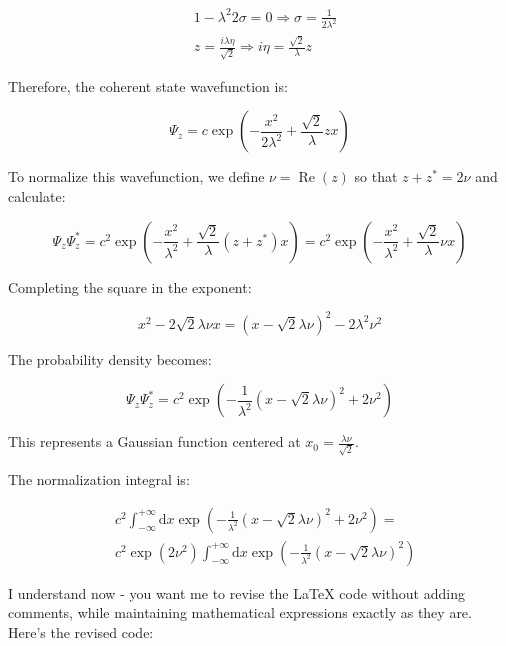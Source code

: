 \documentclass[italian]{HKNdocument}
\begin{document}
\begin{align*}
& 1-\lambda^{2} 2 \sigma=0 \Longrightarrow \sigma=\frac{1}{2 \lambda^{2}} \\
& z=\frac{i \lambda \eta}{\sqrt{2}} \Longrightarrow i \eta=\frac{\sqrt{2}}{\lambda} z \tag{7.52}
\end{align*}

Therefore, the coherent state wavefunction is:

\begin{equation*}
\Psi_{z}=c \exp \left(-\frac{x^{2}}{2 \lambda^{2}}+\frac{\sqrt{2}}{\lambda} z x\right) \tag{7.53}
\end{equation*}

To normalize this wavefunction, we define $\nu=\operatorname{Re}(z)$ so that $z+z^{*}=2 \nu$ and calculate:

\begin{equation*}
\Psi_{z} \Psi_{z}^{*}=c^{2} \exp \left(-\frac{x^{2}}{\lambda^{2}}+\frac{\sqrt{2}}{\lambda}\left(z+z^{*}\right) x\right)=c^{2} \exp \left(-\frac{x^{2}}{\lambda^{2}}+\frac{\sqrt{2}}{\lambda} \nu x\right) \tag{7.54}
\end{equation*}

Completing the square in the exponent:

\begin{equation*}
x^{2}-2 \sqrt{2} \lambda \nu x=(x-\sqrt{2} \lambda \nu)^{2}-2 \lambda^{2} \nu^{2} \tag{7.55}
\end{equation*}

The probability density becomes:

\begin{equation*}
\Psi_{z} \Psi_{z}^{*}=c^{2} \exp \left(-\frac{1}{\lambda^{2}}(x-\sqrt{2} \lambda \nu)^{2}+2 \nu^{2}\right) \tag{7.56}
\end{equation*}

This represents a Gaussian function centered at $x_{0}=\frac{\lambda \nu}{\sqrt{2}}$.

The normalization integral is:

\begin{align*}
& c^{2} \int_{-\infty}^{+\infty} \mathrm{d} x \exp \left(-\frac{1}{\lambda^{2}}(x-\sqrt{2} \lambda \nu)^{2}+2 \nu^{2}\right)= \\
& c^{2} \exp \left(2 \nu^{2}\right) \int_{-\infty}^{+\infty} \mathrm{d} x \exp \left(-\frac{1}{\lambda^{2}}(x-\sqrt{2} \lambda \nu)^{2}\right) \tag{7.57}
\end{align*}

I understand now - you want me to revise the LaTeX code without adding comments, while maintaining mathematical expressions exactly as they are. Here's the revised code:
\end{document}
